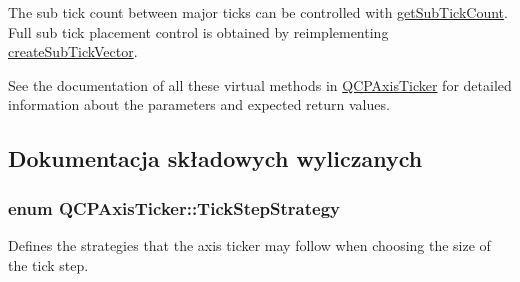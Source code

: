 The sub tick count between major ticks can be controlled with \hyperlink{class_q_c_p_axis_ticker_a4ccc403ced7a1457ce6ba293509933c8}{get\+Sub\+Tick\+Count}. Full sub tick placement control is obtained by reimplementing \hyperlink{class_q_c_p_axis_ticker_a9a6435723fa0bd366d1ea4c2cff7c33f}{create\+Sub\+Tick\+Vector}.

See the documentation of all these virtual methods in \hyperlink{class_q_c_p_axis_ticker}{Q\+C\+P\+Axis\+Ticker} for detailed information about the parameters and expected return values. 

\subsection{Dokumentacja składowych wyliczanych}
\subsubsection[{\texorpdfstring{Tick\+Step\+Strategy}{TickStepStrategy}}]{\setlength{\rightskip}{0pt plus 5cm}enum {\bf Q\+C\+P\+Axis\+Ticker\+::\+Tick\+Step\+Strategy}}\hypertarget{class_q_c_p_axis_ticker_ab6d2f9d9477821623ac9bc4b21ddf49a}{}\label{class_q_c_p_axis_ticker_ab6d2f9d9477821623ac9bc4b21ddf49a}
Defines the strategies that the axis ticker may follow when choosing the size of the tick step.

